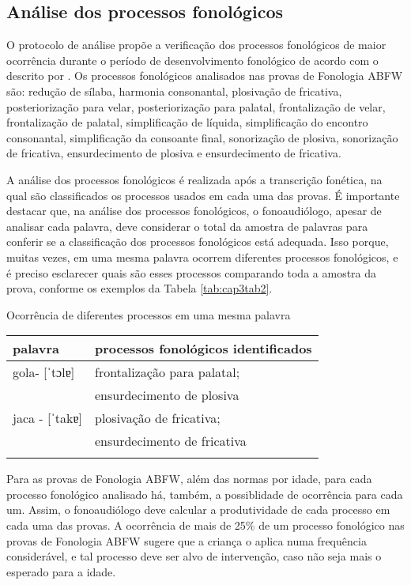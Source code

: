 \documentclass[output=paper,colorlinks,citecolor=brown,booklanguage=portuguese]{langscibook}
\begin{document}
\subsection{Análise dos processos fonológicos}
O protocolo de análise propõe a verificação dos processos fonológicos de maior ocorrência durante o período de desenvolvimento fonológico de acordo com o descrito por \citet{Wertzner1992, Wertzner1995}. Os processos fonológicos analisados nas provas de Fonologia ABFW são: redução de sílaba, harmonia consonantal, plosivação de fricativa, posteriorização para velar, posteriorização para palatal, frontalização de velar, frontalização de palatal, simplificação de líquida, simplificação do encontro consonantal, simplificação da consoante final, sonorização de plosiva, sonorização de fricativa, ensurdecimento de plosiva e ensurdecimento de fricativa.

A análise dos processos fonológicos é realizada após a transcrição fonética, na qual são classificados os processos usados em cada uma das provas. É importante destacar que, na análise dos processos fonológicos, o fonoaudiólogo, apesar de analisar cada palavra, deve considerar o total da amostra de palavras para conferir se a classificação dos processos fonológicos está adequada. Isso porque, muitas vezes, em uma mesma palavra ocorrem diferentes processos fonológicos, e é preciso esclarecer quais são esses processos comparando toda a amostra da prova, conforme os exemplos da Tabela \ref{tab:cap3tab2}.



\begin{Tabela}
\caption{Ocorrência de diferentes processos em uma mesma palavra}
\label{tab:cap3tab2}


\begin{tabularx}{.8\textwidth}{lQ}
\lsptoprule
 \textbf{palavra} & \textbf{processos fonológicos identificados} \\
 \midrule
 gola- [ˈtɔlɐ] & frontalização para palatal; \\
  & ensurdecimento de plosiva\\
 \tablevspace
jaca - [ˈtakɐ] & plosivação de fricativa; \\
  & ensurdecimento de fricativa\\
 \lspbottomrule
\end{tabularx}
\end{Tabela}



Para as provas de Fonologia ABFW, além das normas por idade, para cada processo fonológico analisado há, também, a possiblidade de ocorrência para cada um. Assim, o fonoaudiólogo deve calcular a produtividade de cada processo em cada uma das provas. A ocorrência de mais de 25\% de um processo fonológico nas provas de Fonologia ABFW sugere que a criança o aplica numa frequência considerável, e tal processo deve ser alvo de intervenção, caso não seja mais o esperado para a idade.
\end{document}
